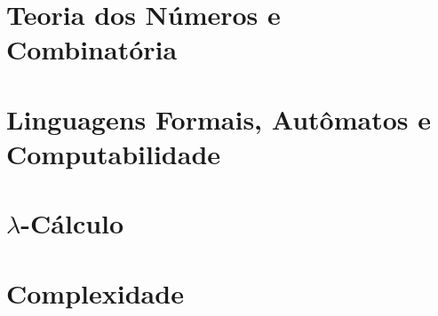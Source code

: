 \documentclass[lang=pt, citestyle=numeric-comp, bibstyle=numeric-comp, math=newtx, 11pt, fancy]{elegantbook}
\begin{document}
	\part{Teoria dos Números e Combinatória}
	
	\part{Linguagens Formais, Autômatos e Computabilidade}
	
	
	
	
	\part{\texorpdfstring{$\lambda$-Cálculo}{Lambda Cálculo}}
	
	\part{Complexidade}
	
	
	\printbibliography
	
\end{document}
